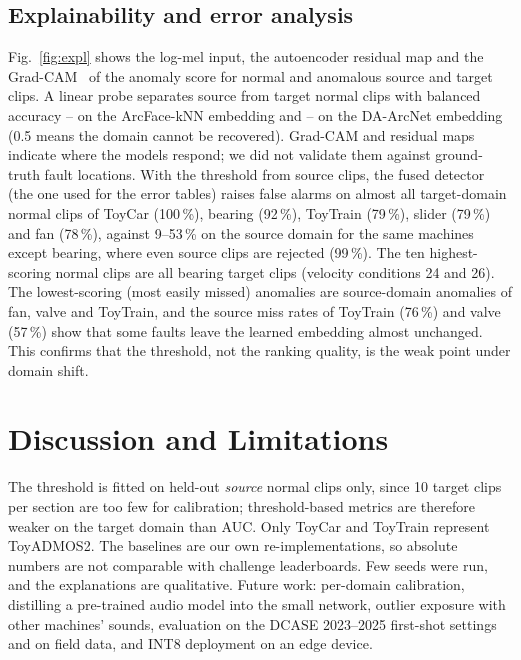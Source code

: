 \documentclass[conference]{IEEEtran}
\providecommand{\ProbeArc}{--}\providecommand{\ProbeProp}{--}
\begin{document}
\subsection{Explainability and error analysis}
Fig.~\ref{fig:expl} shows the log-mel input, the autoencoder residual map and the Grad-CAM~\cite{selvaraju2017gradcam} of the anomaly score for normal and anomalous source and target clips. A linear probe separates source from target normal clips with balanced accuracy \ProbeArc{} on the ArcFace-kNN embedding and \ProbeProp{} on the DA-ArcNet embedding (0.5 means the domain cannot be recovered). Grad-CAM and residual maps indicate where the models respond; we did not validate them against ground-truth fault locations.
With the threshold from source clips, the fused detector (the one used for the error tables) raises false alarms on almost all target-domain normal clips of ToyCar (100\,\%), bearing (92\,\%), ToyTrain (79\,\%), slider (79\,\%) and fan (78\,\%), against 9--53\,\% on the source domain for the same machines except bearing, where even source clips are rejected (99\,\%). The ten highest-scoring normal clips are all bearing target clips (velocity conditions 24 and 26). The lowest-scoring (most easily missed) anomalies are source-domain anomalies of fan, valve and ToyTrain, and the source miss rates of ToyTrain (76\,\%) and valve (57\,\%) show that some faults leave the learned embedding almost unchanged. This confirms that the threshold, not the ranking quality, is the weak point under domain shift.

\section{Discussion and Limitations}
The threshold is fitted on held-out \emph{source} normal clips only, since 10 target clips per section are too few for calibration; threshold-based metrics are therefore weaker on the target domain than AUC. Only ToyCar and ToyTrain represent ToyADMOS2. The baselines are our own re-implementations, so absolute numbers are not comparable with challenge leaderboards. Few seeds were run, and the explanations are qualitative. Future work: per-domain calibration, distilling a pre-trained audio model into the small network, outlier exposure with other machines' sounds, evaluation on the DCASE 2023--2025 first-shot settings and on field data, and INT8 deployment on an edge device.
\end{document}
